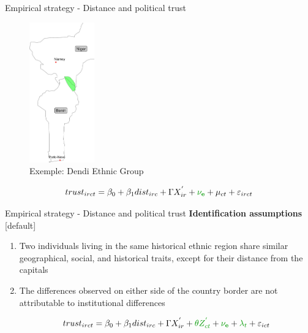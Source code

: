\documentclass[10pt]{beamer}
\begin{document}
\begin{frame}{Empirical strategy - Distance and political trust}

    \begin{figure}
        \centering
        \caption{Exemple: Dendi Ethnic Group}
        \includegraphics[width=2.8cm]{bdd_map.jpg}
    \end{figure}

\begin{equation}
trust_{irct}=\beta_{0}+\beta_{1}dist_{irc}+\Gamma X^{'}_{ir}+\textcolor[rgb]{0.0,0.6,0.0}{\mathbf{\nu_{e}}}+\mu_{ct}+\varepsilon_{irct}
\end{equation}

\end{frame}


\begin{frame}{Empirical strategy - Distance and political trust}
    \centering \textcolor{rougeprez}{\textbf{Identification assumptions}}\vfill
    [default]
    \begin{enumerate}
        \item Two individuals living in the same historical ethnic region share similar geographical, social, and historical traits, except for their distance from the capitals\vfill
        \item The differences observed on either side of the country border are not attributable to institutional differences\vfill
        
\begin{equation}
    trust_{irct}=\beta_{0}+\beta_{1}dist_{irc}+\Gamma X^{'}_{ir}+ \textcolor[rgb]{0.0,0.6,0.0}{\theta Z^{'}_{ct}} + \textcolor[rgb]{0.0,0.6,0.0}{\mathbf{\nu_{e}}}+\textcolor[rgb]{0.0,0.6,0.0}{\lambda_{t}}+\varepsilon_{ict}
    \end{equation}
            
    \end{enumerate}
\end{frame}
\end{document}
